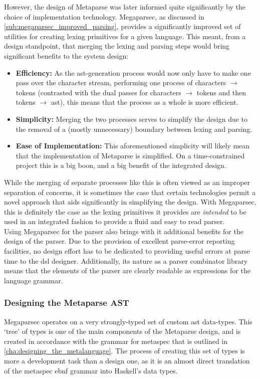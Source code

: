 However, the design of Metaparse was later informed quite significantly by the choice of implementation technology. 
Megaparsec, as discussed in \autoref{sub:megaparsec_improved_parsing}, provides a significantly improved set of utilities for creating lexing primitives for a given language. 
This meant, from a design standpoint, that merging the lexing and parsing steps would bring significant benefits to the system design:
\begin{itemize}
    \item \textbf{Efficiency:} As the \gls{ast}-generation process would now only have to make one pass over the character stream, performing one process of characters $\to$ tokens (contrasted with the dual passes for characters $\to$ tokens and then tokens $\to$ \gls{ast}), this means that the process as a whole is more efficient.
    \item \textbf{Simplicity:} Merging the two processes serves to simplify the design due to the removal of a (mostly unnecessary) boundary between lexing and parsing.
    \item \textbf{Ease of Implementation:} This aforementioned simplicity will likely mean that the implementation of Metaparse is simplified.
    On a time-constrained project this is a big boon, and a big benefit of the integrated design.
\end{itemize}

While the merging of separate processes like this is often viewed as an improper separation of concerns, it is sometimes the case that certain technologies permit a novel approach that aids significantly in simplifying the design.
With Megaparsec, this is definitely the case as the lexing primitives it provides are \textit{intended} to be used in an integrated fashion to provide a fluid and easy to read parser. \\

Using Megaparsec for the parser also brings with it additional benefits for the design of the parser. 
Due to the provision of excellent parse-error reporting facilities, no design effort has to be dedicated to providing useful errors at parse time to the \gls{dsl} designer. 
Additionally, its nature as a parser combinator library means that the elements of the parser are clearly readable as expressions for the language grammar. 


\subsubsection{Designing the Metaparse AST} %
\label{ssub:designing_the_metaparse_ast}
Megaparsec operates on a very strongly-typed set of custom \gls{ast} data-types. 
This `tree' of types is one of the main components of the Metaparse design, and is created in accordance with the grammar for \gls{metaspec} that is outlined in \autoref{cha:designing_the_metalanguage}.
The process of creating this set of types is more a development task than a design one, as it is an almost direct translation of the \gls{metaspec} \gls{ebnf} grammar into Haskell's data types. \\

